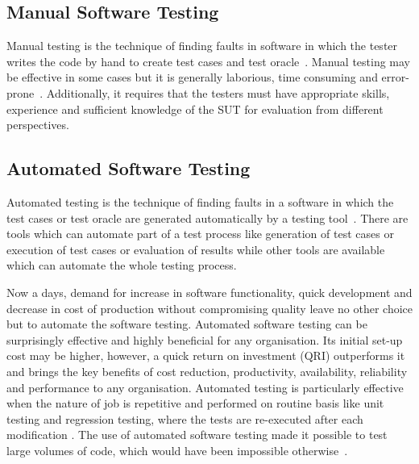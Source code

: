 {%



\subsection{Manual Software Testing}
Manual testing is the technique of finding faults in software in which the tester writes the code by hand to create test cases and test oracle~\cite{Ciupa2008}. Manual testing may be effective in some cases but it is generally laborious, time consuming and error-prone~\cite{tretmans1999}. Additionally, it requires that the testers must have appropriate skills, experience and sufficient knowledge of the SUT for evaluation from different perspectives.
 
\subsection{Automated Software Testing}
Automated testing is the technique of finding faults in a software in which the test cases or test oracle are generated automatically by a testing tool~\cite{Leitner2007}. There are tools which can automate part of a test process like generation of test cases or execution of test cases or evaluation of results while other tools are available which can automate the whole testing process. 

Now a days, demand for increase in software functionality, quick development and decrease in cost of production without compromising quality leave no other choice but to automate the software testing. Automated software testing can be surprisingly effective and highly beneﬁcial for any organisation. Its initial set-up cost may be higher, however, a quick return on investment (QRI) outperforms it and brings the key beneﬁts of cost reduction, productivity, availability, reliability and performance to any organisation. Automated testing is particularly effective when the nature of job is repetitive and performed on routine basis like unit testing and regression testing, where the tests are re-executed after each modification \cite{huang2003automated}. The use of automated software testing made it possible to test large volumes of code, which would have been impossible otherwise~\cite{ramamoorthy1975testing}.


}
